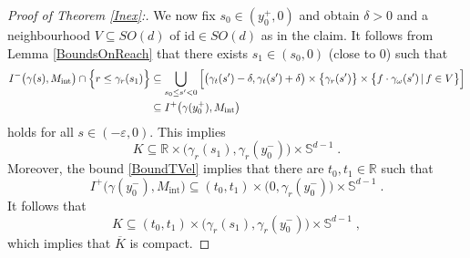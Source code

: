 \documentclass[reqno]{article}
\newcommand{\R}{\mathbb{R}}
\newcommand{\Sd}{\mathbb{S}^{d-1}}
\newcommand{\Mint}{M_{\mathrm{int}}}
\begin{document}
\begin{proof}[Proof of Theorem \ref{Inex}:]
We now fix $s_0 \in (y^+_0, 0)$ and obtain $\delta >0$ and a neighbourhood $V \subseteq SO(d)$ of $\mathrm{id} \in SO(d)$ as in the claim. It follows from Lemma \ref{BoundsOnReach} that there exists $s_1 \in (s_0 ,0)$ (close to $0$) such that
\begin{equation*}
\begin{split}
I^-\big(\gamma(s),\Mint\big) \cap \Big{\{} r \leq \gamma_r(s_1)\Big{\}} &\subseteq \bigcup_{s_0  \leq s' <0} \Big[ \big(\gamma_t(s') - \delta, \gamma_t(s') + \delta\big) \times \big{\{}\gamma_r(s')\big{\}} \times \big{\{}f \cdot \gamma_\omega(s') \, | \, f \in V\big{\}} \Big] \\
&\subseteq I^+\big(\gamma(y^+_0),\Mint\big)
\end{split}
\end{equation*}
holds for all $s \in (-\varepsilon, 0)$. This implies 
\begin{equation*}
K \subseteq \R \times \big(\gamma_r(s_1), \gamma_r(y^-_0)\big) \times \Sd \;.
\end{equation*}
Moreover, the bound \eqref{BoundTVel} implies that there are $t_0, t_1 \in \R$ such that 
\begin{equation*}
I^+\big(\gamma(y^-_0),\Mint\big) \subseteq (t_0,t_1) \times \big(0, \gamma_r(y^-_0)\big) \times \Sd \;.
\end{equation*}
It follows that 
\begin{equation*}
K \subseteq (t_0,t_1) \times \big(\gamma_r(s_1), \gamma_r(y^-_0)\big) \times \Sd\;,
\end{equation*}
which implies that $\overline{K}$ is compact.
\vspace*{2mm}


\end{proof}
\end{document}
